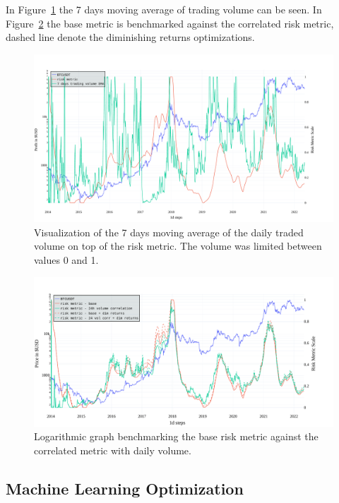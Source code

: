In Figure~\ref{figure-24volume-7sma} the 7 days moving average of trading volume can be seen. In Figure~\ref{figure-24volume-riskmetric} the base metric is benchmarked against the correlated risk metric, dashed line denote the diminishing returns optimizations.

\begin{figure}[!hbt]
    \centering
    \includegraphics[width=\columnwidth]{figures/24volume-7sma.pdf}
    \caption{Visualization of the 7 days moving average of the daily traded volume on top of the risk metric. The volume was limited between values 0 and 1.}
    \label{figure-24volume-7sma}
\end{figure}

\begin{figure}[!hbt]
    \centering
    \includegraphics[width=\columnwidth]{figures/24volume-riskmetric.pdf}
    \caption{Logarithmic graph benchmarking the base risk metric against the correlated metric with daily volume.}
    \label{figure-24volume-riskmetric}
\end{figure}


\subsection*{Machine Learning Optimization}
\label{subsection-ml-optimization}

